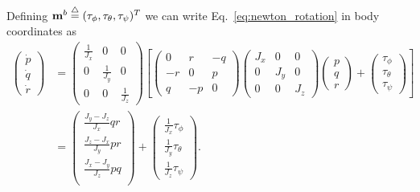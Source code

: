 {Defining $\mathbf{m}^b \stackrel{\triangle}{=} (\tau_{\phi}, \tau_{\theta},
\tau_{\psi})^T$ we can write Eq.~\eqref{eq:newton_rotation} in body
coordinates as
\begin{align*}
\begin{pmatrix} \dot{p} \\ \dot{q} \\ \dot{r} \end{pmatrix}
&= \begin{pmatrix}
        \frac{1}{J_x} & 0 & 0 \\
        0 & \frac{1}{J_y} & 0 \\
        0 & 0 & \frac{1}{J_z}
    \end{pmatrix}
    \left[
    \begin{pmatrix}
        0 & r & -q \\
        -r & 0 & p \\
        q & -p & 0
    \end{pmatrix}
    \begin{pmatrix}
    J_{x}   & 0       & 0 \\
    0       & J_{y}   & 0 \\
    0       & 0       & J_{z}
    \end{pmatrix}
    \begin{pmatrix} p \\ q \\ r \end{pmatrix}
    + \begin{pmatrix} \tau_{\phi} \\ \tau_{\theta} \\ \tau_{\psi} \end{pmatrix}
    \right] \\
&= \begin{pmatrix}
    \frac{J_y-J_z}{J_x} qr\\
    \frac{J_z-J_x}{J_y} pr\\
    \frac{J_x-J_y}{J_z} pq\\
    \end{pmatrix}
    + \begin{pmatrix}
    \frac{1}{J_x} \tau_{\phi} \\
    \frac{1}{J_y} \tau_{\theta} \\
    \frac{1}{J_z} \tau_{\psi}
    \end{pmatrix}.
\end{align*}


}
